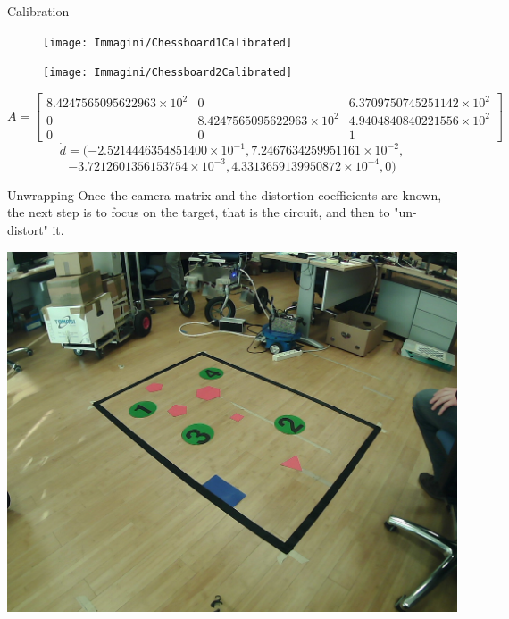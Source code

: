 \begin{frame}{Calibration}
	\begin{figure}[H]
		\begin{minipage}{0.48\linewidth}
			\texttt{[image: Immagini/Chessboard1Calibrated]}
		\end{minipage}
		\vspace{0.04\linewidth}
		\begin{minipage}{0.48\linewidth}
			\texttt{[image: Immagini/Chessboard2Calibrated]}
		\end{minipage}
	\end{figure}
	\stsize
	\[A=\begin{bmatrix}
		8.4247565095622963\times10^2 & 0 & 6.3709750745251142\times10^2\\
		0 & 8.4247565095622963\times10^2 & 4.9404840840221556\times10^2\\
		0 & 0 & 1
	\end{bmatrix}\]\[
	\dot{d}=(-2.5214446354851400\times10^{-1}, 7.2467634259951161\times10^{-2},\]\[-3.7212601356153754\times10^{-3}, 4.3313659139950872\times10^{-4}, 0)
	\]
\end{frame}

\begin{frame}{Unwrapping}
Once the camera matrix and the distortion coefficients are known, the next step is to focus on the target, that is the circuit, and then to "un-distort" it. 
\begin{center}
	\includegraphics[scale=0.155]{Immagini/Wrapped.jpg}
\end{center}
\end{frame}

